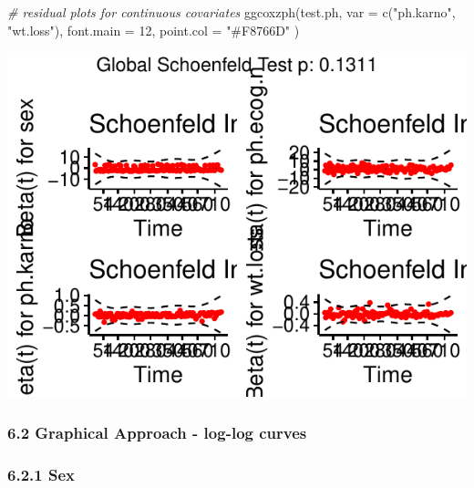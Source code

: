 \documentclass[
]{article}
\newenvironment{Shaded}{\begin{snugshade}}{\end{snugshade}}
\newcommand{\AttributeTok}[1]{\textcolor[rgb]{0.77,0.63,0.00}{#1}}
\newcommand{\CommentTok}[1]{\textcolor[rgb]{0.56,0.35,0.01}{\textit{#1}}}
\newcommand{\DecValTok}[1]{\textcolor[rgb]{0.00,0.00,0.81}{#1}}
\newcommand{\FunctionTok}[1]{\textcolor[rgb]{0.00,0.00,0.00}{#1}}
\newcommand{\NormalTok}[1]{#1}
\newcommand{\StringTok}[1]{\textcolor[rgb]{0.31,0.60,0.02}{#1}}
\begin{document}
\begin{Shaded}
\begin{Highlighting}[]
\CommentTok{\# residual plots for continuous covariates}
\FunctionTok{ggcoxzph}\NormalTok{(test.ph, }
         \AttributeTok{var =} \FunctionTok{c}\NormalTok{(}\StringTok{"ph.karno"}\NormalTok{, }\StringTok{"wt.loss"}\NormalTok{), }
         \AttributeTok{font.main =} \DecValTok{12}\NormalTok{,}
         \AttributeTok{point.col =} \StringTok{"\#F8766D"}
\NormalTok{         )}
\end{Highlighting}
\end{Shaded}

\includegraphics{final_project_files/figure-latex/unnamed-chunk-32-1.pdf}

\hypertarget{graphical-approach---log-log-curves}{%
\subsubsection{6.2 Graphical Approach - log-log
curves}\label{graphical-approach---log-log-curves}}

\hypertarget{sex-1}{%
\subsubsection{6.2.1 Sex}\label{sex-1}}
\end{document}
